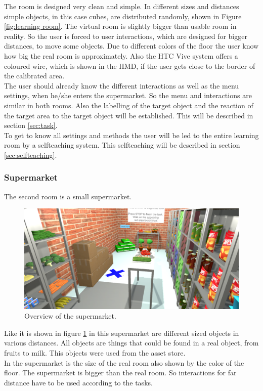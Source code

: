 The room is designed very clean and simple. In different sizes and distances simple objects, in this case cubes, are distributed randomly, shown in Figure \ref{fig:learning room}. The virtual room is slightly bigger than usable room in reality. So the user is forced to user interactions, which are designed for bigger distances, to move some objects. Due to different colors of the floor the user know how big the real room is approximately. Also the HTC Vive system offers a coloured wire, which is shown in the HMD, if the user gets close to the border of the calibrated area.\\
The user should already know the different interactions as well as the menu settings, when he/she enters the supermarket. So the menu and interactions are similar in both rooms. Also the labelling of the target object and the reaction of the target area to the target object will be established. This will be described in section \ref{sec:task}.\\ 
To get to know all settings and methods the user will be led to the entire learning room by a selfteaching system. This selfteaching will be described in section \ref{sec:selfteaching}. 


\subsubsection{Supermarket} \label{sec:supermarket} %
The second room is a small supermarket. 

\begin{figure}[H] 
	\center 
	\includegraphics[width=12cm]{Images/supermarket.PNG}
	\caption[Overview of the supermarket.]{Overview of the supermarket.}
	\label{fig:supermarket}
\end{figure}

Like it is shown in figure \ref{fig:supermarket} in this supermarket are different sized objects in various distances. All objects are things that could be found in a real object, from fruits to milk. This objects were used from the asset store. \cite{asset_food1} \cite{asset_food2} \cite{asset_box}\\
In the supermarket is the size of the real room also shown by the color of the floor. The supermarket is bigger than the real room. So interactions for far distance have to be used according to the tasks.

